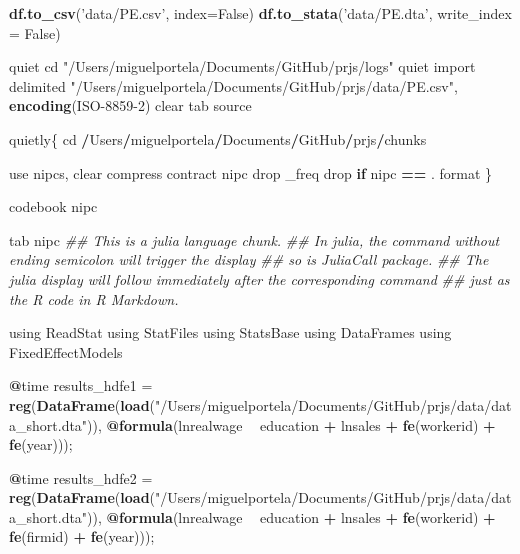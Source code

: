 \documentclass[
  12pt,
]{article}
\newenvironment{Shaded}{\begin{snugshade}}{\end{snugshade}}
\newcommand{\CommentTok}[1]{\textcolor[rgb]{0.56,0.35,0.01}{\textit{#1}}}
\newcommand{\ControlFlowTok}[1]{\textcolor[rgb]{0.13,0.29,0.53}{\textbf{#1}}}
\newcommand{\DataTypeTok}[1]{\textcolor[rgb]{0.13,0.29,0.53}{#1}}
\newcommand{\DecValTok}[1]{\textcolor[rgb]{0.00,0.00,0.81}{#1}}
\newcommand{\FloatTok}[1]{\textcolor[rgb]{0.00,0.00,0.81}{#1}}
\newcommand{\KeywordTok}[1]{\textcolor[rgb]{0.13,0.29,0.53}{\textbf{#1}}}
\newcommand{\NormalTok}[1]{#1}
\newcommand{\OperatorTok}[1]{\textcolor[rgb]{0.81,0.36,0.00}{\textbf{#1}}}
\newcommand{\StringTok}[1]{\textcolor[rgb]{0.31,0.60,0.02}{#1}}
\begin{document}
\begin{Shaded}
\begin{Highlighting}[]
\KeywordTok{df.to_csv}\NormalTok{(}\StringTok{'data/PE.csv'}\NormalTok{, }\DataTypeTok{index=}\NormalTok{False)}
\KeywordTok{df.to_stata}\NormalTok{(}\StringTok{'data/PE.dta'}\NormalTok{, }\DataTypeTok{write_index =}\NormalTok{ False)}


\NormalTok{quiet cd }\StringTok{"/Users/miguelportela/Documents/GitHub/prjs/logs"}
\NormalTok{quiet import delimited }\StringTok{"/Users/miguelportela/Documents/GitHub/prjs/data/PE.csv"}\NormalTok{, }\KeywordTok{encoding}\NormalTok{(ISO}\DecValTok{-8859-2}\NormalTok{) clear}
\NormalTok{tab source}


\NormalTok{quietly\{}
\NormalTok{cd }\OperatorTok{/}\NormalTok{Users}\OperatorTok{/}\NormalTok{miguelportela}\OperatorTok{/}\NormalTok{Documents}\OperatorTok{/}\NormalTok{GitHub}\OperatorTok{/}\NormalTok{prjs}\OperatorTok{/}\NormalTok{chunks}

\NormalTok{use nipcs, clear}
\NormalTok{compress}
\NormalTok{contract nipc}
\NormalTok{drop _freq}
\NormalTok{drop }\ControlFlowTok{if}\NormalTok{ nipc }\OperatorTok{==}\StringTok{ }\NormalTok{.}
\NormalTok{format %
\NormalTok{\}}

\NormalTok{codebook nipc}

\NormalTok{tab nipc}
\CommentTok{## This is a julia language chunk.}
\CommentTok{## In julia, the command without ending semicolon will trigger the display}
\CommentTok{## so is JuliaCall package.}
\CommentTok{## The julia display will follow immediately after the corresponding command}
\CommentTok{## just as the R code in R Markdown.}

\NormalTok{using ReadStat}
\NormalTok{using StatFiles}
\NormalTok{using StatsBase}
\NormalTok{using DataFrames}
\NormalTok{using FixedEffectModels}

\OperatorTok{@}\NormalTok{time results_hdfe1 =}\StringTok{ }\KeywordTok{reg}\NormalTok{(}\KeywordTok{DataFrame}\NormalTok{(}\KeywordTok{load}\NormalTok{(}\StringTok{"/Users/miguelportela/Documents/GitHub/prjs/data/data_short.dta"}\NormalTok{)), }\OperatorTok{@}\KeywordTok{formula}\NormalTok{(lnrealwage }\OperatorTok{~}\StringTok{ }\NormalTok{education }\OperatorTok{+}\StringTok{ }\NormalTok{lnsales }\OperatorTok{+}\StringTok{ }\KeywordTok{fe}\NormalTok{(workerid) }\OperatorTok{+}\StringTok{ }\KeywordTok{fe}\NormalTok{(year)));}

\OperatorTok{@}\NormalTok{time results_hdfe2 =}\StringTok{ }\KeywordTok{reg}\NormalTok{(}\KeywordTok{DataFrame}\NormalTok{(}\KeywordTok{load}\NormalTok{(}\StringTok{"/Users/miguelportela/Documents/GitHub/prjs/data/data_short.dta"}\NormalTok{)), }\OperatorTok{@}\KeywordTok{formula}\NormalTok{(lnrealwage }\OperatorTok{~}\StringTok{ }\NormalTok{education }\OperatorTok{+}\StringTok{ }\NormalTok{lnsales }\OperatorTok{+}\StringTok{ }\KeywordTok{fe}\NormalTok{(workerid) }\OperatorTok{+}\StringTok{ }\KeywordTok{fe}\NormalTok{(firmid) }\OperatorTok{+}\StringTok{ }\KeywordTok{fe}\NormalTok{(year)));}



}
\end{Highlighting}
\end{Shaded}
\end{document}
